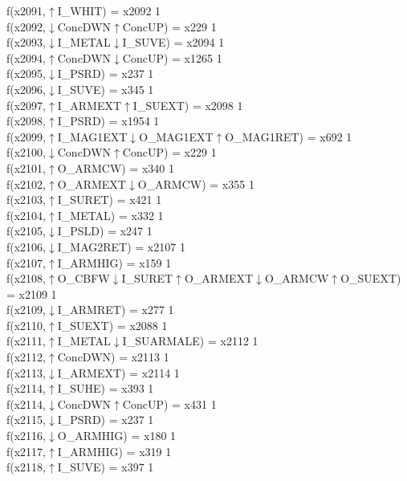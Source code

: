 f(x2091,$\uparrow$I\_WHIT) = x2092 {1} \\
f(x2092,$\downarrow$ConcDWN$\uparrow$ConcUP) = x229 {1} \\
f(x2093,$\downarrow$I\_METAL$\downarrow$I\_SUVE) = x2094 {1} \\
f(x2094,$\uparrow$ConcDWN$\downarrow$ConcUP) = x1265 {1} \\
f(x2095,$\downarrow$I\_PSRD) = x237 {1} \\
f(x2096,$\downarrow$I\_SUVE) = x345 {1} \\
f(x2097,$\uparrow$I\_ARMEXT$\uparrow$I\_SUEXT) = x2098 {1} \\
f(x2098,$\uparrow$I\_PSRD) = x1954 {1} \\
f(x2099,$\uparrow$I\_MAG1EXT$\downarrow$O\_MAG1EXT$\uparrow$O\_MAG1RET) = x692 {1} \\
f(x2100,$\downarrow$ConcDWN$\uparrow$ConcUP) = x229 {1} \\
f(x2101,$\uparrow$O\_ARMCW) = x340 {1} \\
f(x2102,$\uparrow$O\_ARMEXT$\downarrow$O\_ARMCW) = x355 {1} \\
f(x2103,$\uparrow$I\_SURET) = x421 {1} \\
f(x2104,$\uparrow$I\_METAL) = x332 {1} \\
f(x2105,$\downarrow$I\_PSLD) = x247 {1} \\
f(x2106,$\downarrow$I\_MAG2RET) = x2107 {1} \\
f(x2107,$\uparrow$I\_ARMHIG) = x159 {1} \\
f(x2108,$\uparrow$O\_CBFW$\downarrow$I\_SURET$\uparrow$O\_ARMEXT$\downarrow$O\_ARMCW$\uparrow$O\_SUEXT) = x2109 {1} \\
f(x2109,$\downarrow$I\_ARMRET) = x277 {1} \\
f(x2110,$\uparrow$I\_SUEXT) = x2088 {1} \\
f(x2111,$\uparrow$I\_METAL$\downarrow$I\_SUARMALE) = x2112 {1} \\
f(x2112,$\uparrow$ConcDWN) = x2113 {1} \\
f(x2113,$\downarrow$I\_ARMEXT) = x2114 {1} \\
f(x2114,$\uparrow$I\_SUHE) = x393 {1} \\
f(x2114,$\downarrow$ConcDWN$\uparrow$ConcUP) = x431 {1} \\
f(x2115,$\downarrow$I\_PSRD) = x237 {1} \\
f(x2116,$\downarrow$O\_ARMHIG) = x180 {1} \\
f(x2117,$\uparrow$I\_ARMHIG) = x319 {1} \\
f(x2118,$\uparrow$I\_SUVE) = x397 {1} \\
